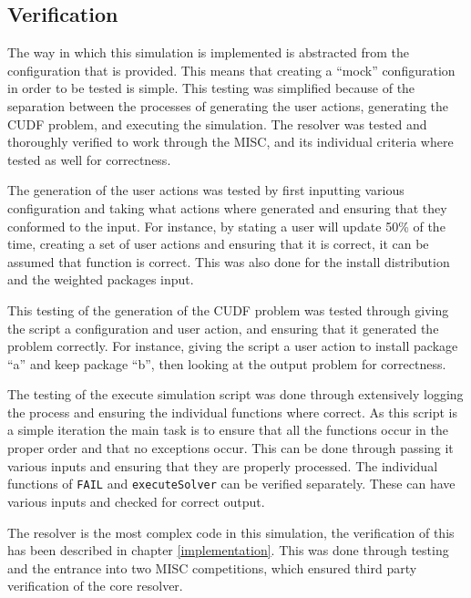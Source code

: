 \subsection{Verification}
The way in which this simulation is implemented is abstracted from the configuration that is provided.
This means that creating a ``mock'' configuration in order to be tested is simple.
This testing was simplified because of the separation between the processes of generating the user actions, generating the CUDF problem, and executing the simulation.
The resolver was tested and thoroughly verified to work through the MISC, and its individual criteria where tested as well for correctness.

The generation of the user actions was tested by first inputting various configuration and taking what actions where generated and ensuring that they conformed to the input.
For instance, by stating a user will update 50\% of the time, creating a set of user actions and ensuring that it is correct, it can be assumed that function is correct.
This was also done for the install distribution and the weighted packages input.

This testing of the generation of the CUDF problem was tested through giving the script a configuration and user action, and ensuring that it generated the problem correctly. 
For instance, giving the script a user action to install package ``a'' and keep package ``b'', then looking at the output problem for correctness.

The testing of the execute simulation script was done through extensively logging the process and ensuring the individual functions where correct.
As this script is a simple iteration the main task is to ensure that all the functions occur in the proper order and that no exceptions occur.
This can be done through passing it various inputs and ensuring that they are properly processed.
The individual functions of \verb+FAIL+ and \verb+executeSolver+ can be verified separately.
These can have various inputs and checked for correct output.

The resolver is the most complex code in this simulation, the verification of this has been described in chapter \ref{implementation}.
This was done through testing and the entrance into two MISC competitions, which ensured third party verification of the core resolver.

